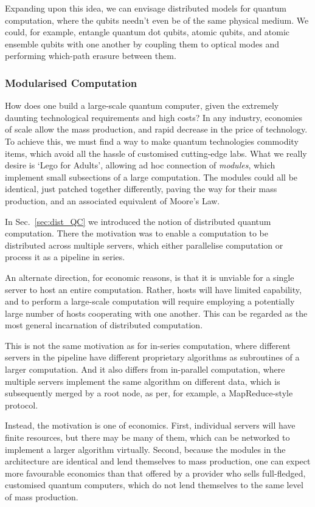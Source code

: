 \documentclass[aps,rmp,twocolumn,amsmath,amssymb,nofootinbib,superscriptaddress]{revtex4}
\begin{document}
Expanding upon this idea, we can envisage distributed models for quantum computation, where the qubits needn't even be of the same physical medium. We could, for example, entangle quantum dot qubits, atomic qubits, and atomic ensemble qubits with one another by coupling them to optical modes and performing which-path erasure between them.

%
%

\subsubsection{Modularised Computation}

How does one build a large-scale quantum computer, given the extremely daunting technological requirements and high costs? In any industry, economies of scale allow the mass production, and rapid decrease in the price of technology. To achieve this, we must find a way to make quantum technologies commodity items, which avoid all the hassle of customised cutting-edge labs. What we really desire is `Lego for Adults', allowing ad hoc connection of \emph{modules}, which implement small subsections of a large computation. The modules could all be identical, just patched together differently, paving the way for their mass production, and an associated equivalent of Moore's Law.

In Sec.~\ref{sec:dist_QC} we introduced the notion of distributed quantum computation. There the motivation was to enable a computation to be distributed across multiple servers, which either parallelise computation or process it as a pipeline in series.

An alternate direction, for economic reasons, is that it is unviable for a single server to host an entire computation. Rather, hosts will have limited capability, and to perform a large-scale computation will require employing a potentially large number of hosts cooperating with one another. This can be regarded as the most general incarnation of distributed computation.

This is not the same motivation as for in-series computation, where different servers in the pipeline have different proprietary algorithms as subroutines of a larger computation. And it also differs from in-parallel computation, where multiple servers implement the same algorithm on different data, which is subsequently merged by a root node, as per, for example, a {\sc MapReduce}-style protocol.

Instead, the motivation is one of economics. First, individual servers will have finite resources, but there may be many of them, which can be networked to implement a larger algorithm virtually. Second, because the modules in the architecture are identical and lend themselves to mass production, one can expect more favourable economics than that offered by a provider who sells full-fledged, customised quantum computers, which do not lend themselves to the same level of mass production.
\end{document}

